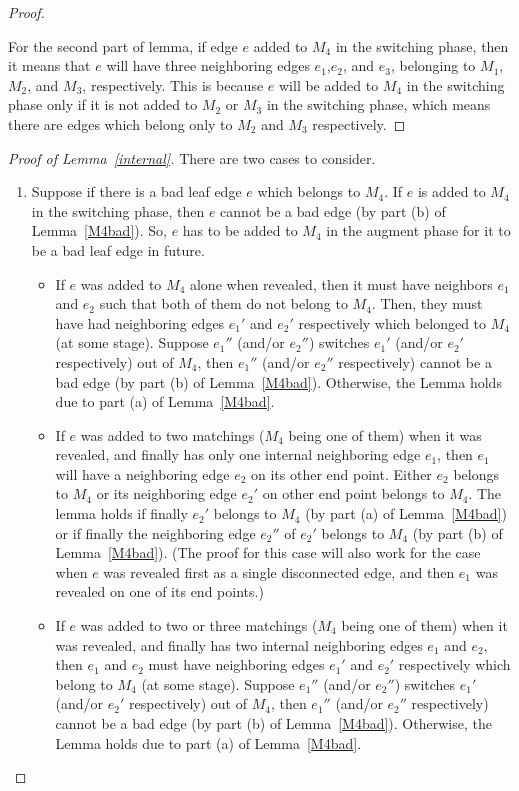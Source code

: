 \documentclass[11pt]{article}
\begin{document}
\begin{appendix}
\begin{proof}
\begin{enumerate}
  \end{enumerate}
For the second part of lemma, if edge $e$ added to $M_4$ in the switching phase, then it means that $e$ will have three neighboring edges $e_1$,$e_2$, and $e_3$, belonging to $M_1$, $M_2$, and $M_3$, respectively. This is because $e$ will be added to $M_4$ in the switching phase only if it is not added to $M_2$ or $M_3$ in the switching phase, which means there are edges which belong only to $M_2$ and $M_3$ respectively.
 \end{proof}
\begin{proof}[Proof of Lemma~\ref{internal}]
There are two cases to consider.
\begin{enumerate}
 \item Suppose if there is a bad leaf edge $e$ which belongs to $M_4$. If $e$ is added to $M_4$ in the switching phase, then $e$ cannot be a bad edge (by part (b) of Lemma~\ref{M4bad}). So, $e$ has to be added to $M_4$ in the augment phase for it to be a bad leaf edge in future.
 \begin{itemize}
  \item If $e$ was added to $M_4$ alone when revealed, then it must have neighbors $e_1$ and $e_2$ such that both of them do not belong to $M_4$. Then, they must have had neighboring edges $e_1'$ and $e_2'$ respectively which belonged to $M_4$ (at some stage). Suppose $e_1''$ (and/or $e_2''$) switches $e_1'$ (and/or $e_2'$ respectively) out of $M_4$, then $e_1''$ (and/or $e_2''$ respectively) cannot be a bad edge (by part (b) of Lemma~\ref{M4bad}). Otherwise, the Lemma holds due to part (a) of Lemma~\ref{M4bad}.
  \item If $e$ was added to two matchings ($M_4$ being one of them) when it was revealed, and finally has only one internal neighboring edge $e_1$, then $e_1$ will have a neighboring edge $e_2$ on its other end point. Either $e_2$ belongs to $M_4$ or its neighboring edge $e_2'$ on other end point belongs to $M_4$. The lemma holds if finally $e_2'$ belongs to $M_4$ (by part (a) of Lemma~\ref{M4bad}) or if finally the neighboring edge $e_2''$ of $e_2'$ belongs to $M_4$ (by part (b) of Lemma~\ref{M4bad}). (The proof for this case will also work for the case when $e$ was revealed first as a single disconnected edge, and then $e_1$ was revealed on one of its end points.)
  \item If $e$ was added to two or three matchings ($M_4$ being one of them) when it was revealed, and finally has two internal neighboring edges $e_1$ and $e_2$, then $e_1$ and $e_2$ must have neighboring edges $e_1'$ and $e_2'$ respectively which belong to $M_4$ (at some stage). Suppose $e_1''$ (and/or $e_2''$) switches $e_1'$ (and/or $e_2'$ respectively) out of $M_4$, then $e_1''$ (and/or $e_2''$ respectively) cannot be a bad edge (by part (b) of Lemma~\ref{M4bad}). Otherwise, the Lemma holds due to part (a) of Lemma~\ref{M4bad}.

\end{itemize}
\end{enumerate}
\end{proof}
\end{appendix}
\end{document}
